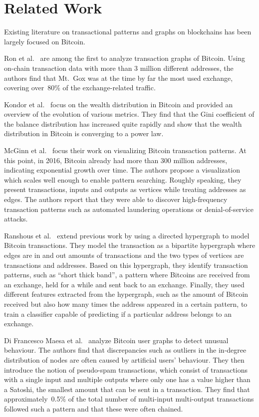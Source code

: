 \section{Related Work}
\label{sec:4:related}

Existing literature on transactional patterns and graphs on blockchains has been largely focused on Bitcoin.

Ron et al.~\cite{10.1007/978-3-642-39884-1_2} are among the first to analyze transaction graphs of Bitcoin. Using on-chain transaction data with more than 3 million different addresses, the authors find that Mt.~Gox was at the time by far the most used exchange, covering over~80\% of the exchange-related traffic. 

Kondor et al.~\cite{10.1371/journal.pone.0086197} focus on the wealth distribution in Bitcoin and provided an overview of the evolution of various metrics. They find that the Gini coefficient of the balance distribution has increased quite rapidly and show that the wealth distribution in Bitcoin is converging to a power law.

McGinn et al.~\cite{mcginn2016visualizing} focus their work on visualizing Bitcoin transaction patterns. At this point, in 2016, Bitcoin already had more than 300 million addresses, indicating exponential growth over time. The authors propose a visualization which scales well enough to enable pattern searching. Roughly speaking, they present transactions, inputs and outputs as vertices while treating addresses as edges. The authors report that they were able to discover high-frequency transaction patterns such as automated laundering operations or denial-of-service attacks.

Ranshous et al.~\cite{10.1007/978-3-319-70278-0_16} extend previous work by using a directed hypergraph to model Bitcoin transactions. They model the transaction as a bipartite hypergraph where edges are in and out amounts of transactions and the two types of vertices are transactions and addresses. Based on this hypergraph, they identify transaction patterns, such as ``short thick band'', a pattern where Bitcoins are received from an exchange, held for a while and sent back to an exchange. Finally, they used different features extracted from the hypergraph, such as the amount of Bitcoin received but also how many times the address appeared in a certain pattern, to train a classifier capable of predicting if a particular address belongs to an exchange.

Di Francesco Maesa et al.~\cite{10.1007/978-3-319-50901-3_59} analyze Bitcoin user graphs to detect unusual behaviour. The authors find that discrepancies such as outliers in the in-degree distribution of nodes are often caused by artificial users' behaviour. They then introduce the notion of pseudo-spam transactions, which consist of transactions with a single input and multiple outputs where only one has a value higher than a Satoshi, the smallest amount that can be sent in a transaction. They find that approximately~0.5\% of the total number of multi-input multi-output transactions followed such a pattern and that these were often chained.

